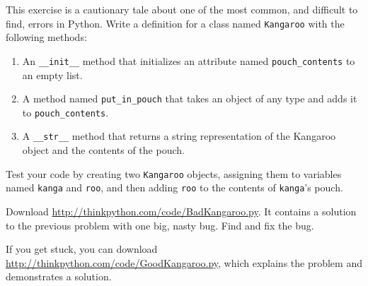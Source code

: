 \documentclass[10pt]{book}
\begin{document}
\begin{exercise}

This exercise is a cautionary tale about one of the most
common, and difficult to find, errors in Python.
Write a definition for a class named {\tt Kangaroo} with the following
methods:

\begin{enumerate}

\item An \verb"__init__" method that initializes an attribute named
\verb"pouch_contents" to an empty list.

\item A method named \verb"put_in_pouch" that takes an object
of any type and adds it to \verb"pouch_contents".

\item A \verb"__str__" method that returns a string representation
of the Kangaroo object and the contents of the pouch.

\end{enumerate}
%
Test your code
by creating two {\tt Kangaroo} objects, assigning them to variables
named {\tt kanga} and {\tt roo}, and then adding {\tt roo} to the
contents of {\tt kanga}'s pouch.

Download \url{http://thinkpython.com/code/BadKangaroo.py}.  It contains
a solution to the previous problem with one big, nasty bug.
Find and fix the bug.

If you get stuck, you can download
\url{http://thinkpython.com/code/GoodKangaroo.py}, which explains the
problem and demonstrates a solution.

\end{exercise}
\end{document}
